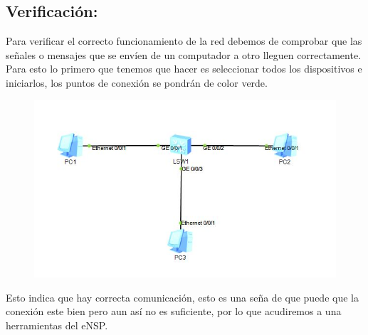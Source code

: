 \documentclass[journal]{IEEEtran}
\begin{document}
\subsection{Verificación:}
Para verificar el correcto funcionamiento de la red debemos de comprobar que las señales o mensajes que se envíen de un computador a otro lleguen correctamente.\\
Para esto lo primero que tenemos que hacer es seleccionar todos los dispositivos e iniciarlos, los puntos de conexión  se pondrán de color verde.
\begin{center}
\begin{figure}[H]
\centering
\includegraphics[scale=0.55]{10.JPG} 
\end{figure}
\end{center}
Esto indica que hay correcta comunicación, esto es una seña de que puede que la conexión este bien pero aun así no es suficiente, por lo que acudiremos a una herramientas del eNSP.\\
\end{document}
